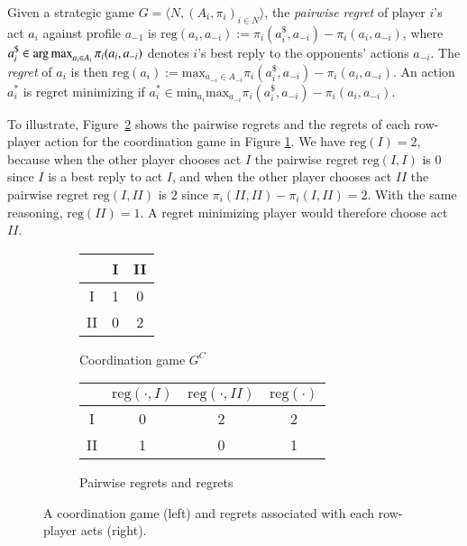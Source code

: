 \documentclass[fleqn,reqno,11pt]{article}
\begin{document}
\begin{definition} \label{defn:regret} Given a strategic game
  $ G=\langle N, (A_i , \pi_i)_{i \in N} \rangle $, the \emph{pairwise regret} of player $i$'s
  act $a_i$ against profile $a_{-1}$ is
  $\text{reg}(a_i,a_{-i}):= \pi_i(a_i^\$,a_{-i})-\pi_i(a_i,a_{-i}) $, where
  $a_i^\$ \in \operatorname*{arg\,max}_{a_i \in A_i} \pi_i(a_i, a_{-i})$ denotes $i$'s best reply to the
  opponents' actions $a_{-i}$. The \emph{regret} of $a_i$ is then
  $\text{reg}(a_i):= \text{max}_{a_{-i}\in A_{-i}} \pi_i(a_i^\$,a_{-i})-\pi_i(a_i,a_{-i}) $. An
  action $a^{*}_i $ is regret minimizing if
  $a^{*}_i \in \text{min}_{a_i} \text{max}_{a_{-i}} \pi_i(a_i^\$,a_{-i})-\pi_i(a_i,a_{-i}) $.
\end{definition}


To illustrate, Figure~\ref{coordgame1reg} shows the pairwise regrets and the regrets of each
row-player action for the coordination game in Figure \ref{coordgame1}. We have
$\text{reg}(I)=2$, because when the other player chooses act $I$ the pairwise regret
$\text{reg}(I,I)$ is $0$ since $I$ is a best reply to act $I$, and when the other player
chooses act $II$ the pairwise regret $\text{reg}(I, II)$ is $2$ since
$\pi_i(II,II)-\pi_i(I,II)=2$. With the same reasoning, $\text{reg}(II)=1$. A regret minimizing
player would therefore choose act $II$.


\begin{figure}

  \begin{subfigure}[b]{0.3\textwidth}
    \centering
    \begin{tabular}{ccc}
      \toprule
      & I & II \\
      \midrule
      I & 1 & 0 \\
      II & 0 & 2\\
      \bottomrule
    \end{tabular}
    \caption{Coordination game $G^C$}
    \label{coordgame1}
  \end{subfigure}
  \hspace{1cm}
  \begin{subfigure}[b]{0.5\textwidth}
    \centering
    \begin{tabular}{cccc}
      \toprule
      & $\text{reg}( \cdot, I)$ & $\text{reg}(\cdot, II)$ & $\text{reg}(\cdot)$ \\
      \midrule
      I  & 0 & 2 & 2 \\ 
      II & 1 & 0 & 1\\
      \bottomrule
    \end{tabular}
    \caption{Pairwise regrets and regrets}
    \label{coordgame1reg}
  \end{subfigure}
  \caption{A coordination game (left) and regrets associated with each row-player acts (right).}
    \label{coordgame1mainFig}
\end{figure}
\end{document}
